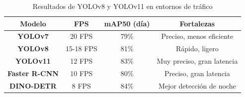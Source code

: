 \documentclass[11pt]{article}
\begin{document}
\begin{table}[htb]
    \centering
    \begin{tabular}{|c|c|c|c|}
         \hline   
         \textbf{Modelo} & \textbf{FPS} & \textbf{mAP50 (día)} & \textbf{Fortalezas} \\
         \hline
         \textbf{YOLOv7} & 20 FPS & 79\% & Preciso, menos eficiente\\ 
         \hline
         \textbf{YOLOv8} & 15-18 FPS & 81\% & Rápido, ligero\\
         \hline
         \textbf{YOLOv11} & 12 FPS & 83\% & Muy preciso, gran latencia\\
         \hline
         \textbf{Faster R-CNN} & 10 FPS & 80\% & Preciso, gran latencia\\
         \hline
         \textbf{DINO-DETR} & 8 FPS & 84\% & Mejor detección de noche\\
         \hline
    \end{tabular}
    \caption{Resultados de YOLOv8 y YOLOv11 en entornos de tráfico}
    \label{tab:shivnatraj}
\end{table}
\end{document}
